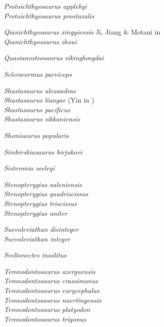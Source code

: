 \documentclass[notuftebib,font=erewhon]{tufte-lualatex}
\begin{document}
\emph{Protoichthyosaurus applebyi} \cite*[Lomax et al.,][]{Lomax2017JVP}\\
\emph{Protoichthyosaurus prostaxalis} \cite*[Appleby,][]{Appleby1979P}

\emph{Qianichthyosaurus xingyiensis} Ji, Jiang \& Motani in
    \cite*[Yang et al.,][]{Yang2013ASNUP}\\
\emph{Qianichthyosaurus zhoui} \cite*[Li,][]{Li1999CSB}

\emph{Quasianosteosaurus vikinghoegdai}
    \cite*[Maisch \& Matzke,][]{Maisch2003NJGPAa}

\emph{Sclerocormus parviceps} \cite*[Jiang et al.,][]{Jiang2016SR}

\emph{Shastasaurus alexandrae} \cite*[Merriam,][]{Merriam1902UCBDG}\\
\emph{Shastasaurus liangae} (Yin in \cite*[Yin et al.,][]{Yin2000GG})\\
\emph{Shastasaurus pacificus} \cite*[Merriam,][]{Merriam1895AJS}\\
\emph{Shastasaurus sikkaniensis}
    \parencite*[Nicholls \& Manabe,][]{Nicholls2004JVP}

\emph{Shonisaurus popularis} \cite*[Camp,][]{Camp1976SOeAW}

\emph{Simbirskiasaurus birjukovi} \cite*[Otschev \& Efimov,][]{Otschev1985PZ}

\emph{Sisteronia seeleyi} \cite*[Fischer et al.,][]{Fischer2014PO}

\emph{Stenopterygius aaleniensis} \cite*[Maxwell et al.,][]{Maxwell2012PO}\\
\emph{Stenopterygius quadriscissus} \parencite*[Quenstedt,][]{Quenstedt1858}\\
\emph{Stenopterygius triscissus} \parencite*[Quenstedt,][]{Quenstedt1858}\\
\emph{Stenopterygius uniter} \cite*[Huene,][]{vonHuene1931ASNG}

\emph{Suevoleviathan disinteger} \parencite*[Huene,][]{vonHuene1926NJFMGPBBB}\\
\emph{Suevoleviathan integer} \parencite*[Bronn,][]{Bronn1844NJMGGP}

\emph{Sveltonectes insolitus} \cite*[Fischer et al.,][]{Fischer2011JVP}

\emph{Temnodontosaurus azerguensis} \cite*[Martin et al.,][]{Martin2012P}\\
\emph{Temnodontosaurus crassimanus} \parencite*[Blake,][]{Blake1876}\\
\emph{Temnodontosaurus eurycephalus} \cite*[McGowan,][]{McGowan1974LSCROM}\\
\emph{Temnodontosaurus nuertingensis} \parencite*[Huene,][]{vonHuene1931NJFMGPBB}\\
\emph{Temnodontosaurus platyodon} \parencite*[Conybeare,][]{Conybeare1822TGSL}\\
\emph{Temnodontosaurus trigonus} \parencite*[Theodori,][]{Theodori1843GAKAWMC}
\end{document}
